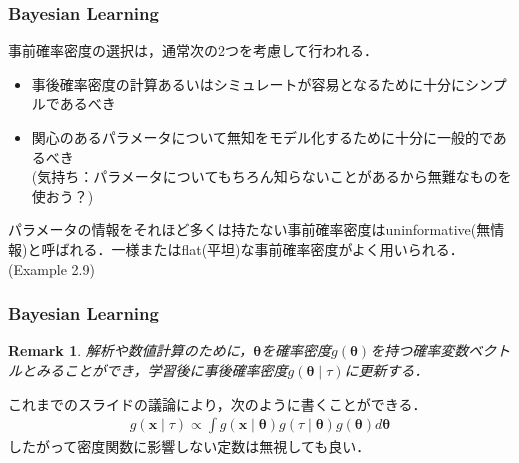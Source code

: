 \documentclass[dvipdfmx,cjk]{beamer}
\theoremstyle{example}
\newtheorem{remark}[thm]{Remark}
\begin{document}
\begin{frame}
    \frametitle{Bayesian Learning}
    事前確率密度の選択は，通常次の2つを考慮して行われる．
    \begin{itemize}
        \item 事後確率密度の計算あるいはシミュレートが容易となるために十分にシンプルであるべき
        \item 関心のあるパラメータについて無知をモデル化するために十分に一般的であるべき\\(気持ち：パラメータについてもちろん知らないことがあるから無難なものを使おう？)
    \end{itemize}
    パラメータの情報をそれほど多くは持たない事前確率密度はuninformative(無情報)と呼ばれる．一様またはflat(平坦)な事前確率密度がよく用いられる．(Example 2.9)
\end{frame}
\begin{frame}
    \frametitle{Bayesian Learning}
    \begin{remark}
        解析や数値計算のために，$\boldsymbol{\theta}$を確率密度$g(\boldsymbol{\theta})$を持つ確率変数ベクトルとみることができ，学習後に事後確率密度$g(\boldsymbol{\theta}\mid\tau)$に更新する．
    \end{remark}
    これまでのスライドの議論により，次のように書くことができる．
    \begin{align*}
        g(\boldsymbol{x}\mid\tau)\propto \int g(\boldsymbol{x}\mid\boldsymbol{\theta})g(\tau\mid\boldsymbol{\theta})g(\boldsymbol{\theta})d\boldsymbol{\theta}
    \end{align*}
    したがって密度関数に影響しない定数は無視しても良い．
\end{frame}
\end{document}
